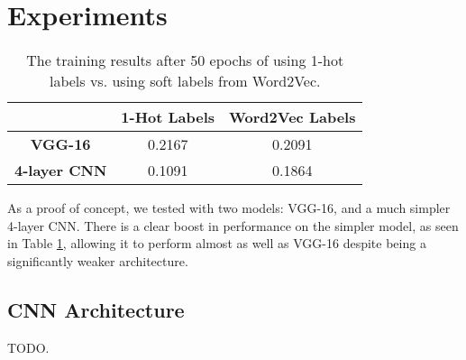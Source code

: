 \section{Experiments}

\begin{table}[!tb]
  \centering
  \begin{tabular}{|c|c|c|}
    \hline
      & \textbf{1-Hot Labels} & \textbf{Word2Vec Labels} \\
    \hline
      \textbf{VGG-16} & 0.2167 & 0.2091 \\
    \hline
      \textbf{4-layer CNN} & 0.1091 & 0.1864 \\
    \hline
  \end{tabular}
  \caption{
    The training results after 50 epochs of using 1-hot labels vs. using soft
    labels from Word2Vec.
  }
  \label{tbl:results}
\end{table}


As a proof of concept, we tested with two models: VGG-16, and a much simpler
4-layer CNN. There is a clear boost in performance on the simpler model, as
seen in Table \ref{tbl:results}, allowing it to perform almost as well as
VGG-16 despite being a significantly weaker architecture.


\subsection{CNN Architecture}

TODO.
